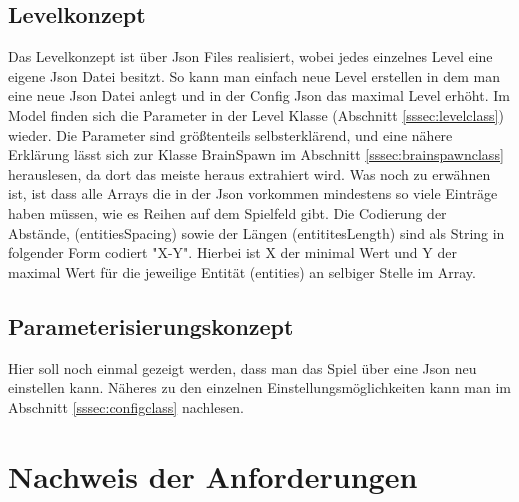 \documentclass[a4paper,10pt]{report}
\begin{document}
    \section{Levelkonzept}
    {
    	\label{sec:levelconcept}
    	Das Levelkonzept ist über Json Files realisiert, wobei jedes einzelnes Level eine eigene Json Datei besitzt. So kann man einfach neue Level erstellen in dem man 
    	eine neue Json Datei anlegt und in der Config Json das maximal Level erhöht. Im Model finden sich die Parameter in der Level Klasse (Abschnitt \ref{sssec:levelclass}) 
    	wieder.
    	\newline \newline 	
    	\noindent
		Die Parameter sind größtenteils selbsterklärend, und eine nähere Erklärung lässt sich zur Klasse BrainSpawn im Abschnitt \ref{sssec:brainspawnclass} herauslesen, 
		da dort das meiste heraus extrahiert wird. Was noch zu erwähnen ist, ist dass alle Arrays die in der Json vorkommen mindestens so viele Einträge haben müssen, wie es 
		Reihen auf dem Spielfeld gibt. Die Codierung der Abstände, (entitiesSpacing) sowie der Längen (entititesLength) sind als String in folgender Form codiert "X-Y".
		Hierbei ist X der minimal Wert und Y der maximal Wert für die jeweilige Entität (entities) an selbiger Stelle im Array.
		\newpage  	
    		
    }
    
	\newpage
    \section{Parameterisierungskonzept}
    {
    	\label{sec:parameterconcept}
    	Hier soll noch einmal gezeigt werden, dass man das Spiel über eine Json neu einstellen kann.
    	Näheres zu den einzelnen Einstellungsmöglichkeiten kann man im Abschnitt \ref{sssec:configclass} nachlesen.
    	
			    	
    }
  

    \newpage
    \chapter{Nachweis der Anforderungen}
    
\end{document}
